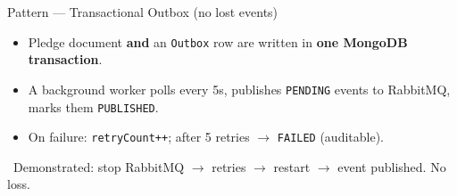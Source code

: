 \documentclass[aspectratio=169]{beamer}
\newcommand{\good}{\textcolor{brandgreen}{\textbf{\checkmark}}}
\begin{document}
\begin{frame}{Pattern --- Transactional Outbox (no lost events)}
  \begin{itemize}\small
    \item Pledge document \textbf{and} an \texttt{Outbox} row are written in \textbf{one MongoDB transaction}.
    \item A background worker polls every 5s, publishes \texttt{PENDING} events to RabbitMQ, marks them \texttt{PUBLISHED}.
    \item On failure: \texttt{retryCount++}; after 5 retries $\rightarrow$ \texttt{FAILED} (auditable).
  \end{itemize}
  \begin{center}\scriptsize
  \end{center}
  \begin{center}\scriptsize\good\ Demonstrated: stop RabbitMQ $\rightarrow$ retries $\rightarrow$ restart $\rightarrow$ event published. No loss.\end{center}
\end{frame}
\end{document}
